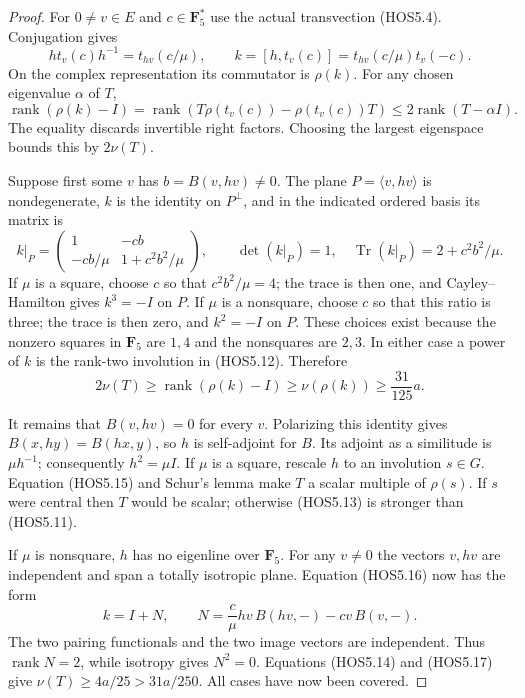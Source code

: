 \begin{proof}
For $0\ne v\in E$ and $c\in\mathbf F_5^*$ use the actual
transvection (HOS5.4). Conjugation gives
\[
 h t_v(c)h^{-1}=t_{hv}(c/\mu),\qquad
 k=[h,t_v(c)]=t_{hv}(c/\mu)t_v(-c).                         \tag{HOS5.16}
\]
On the complex representation its commutator is $\rho(k)$.
For any chosen eigenvalue $\alpha$ of $T$,
\[
 \operatorname{rank}(\rho(k)-I)
 =\operatorname{rank}(T\rho(t_v(c))-\rho(t_v(c))T)
 \le2\operatorname{rank}(T-\alpha I).
                                                               \tag{HOS5.17}
\]
The equality discards invertible right factors. Choosing the
largest eigenspace bounds this by $2\nu(T)$.

Suppose first some $v$ has $b=B(v,hv)\ne0$. The plane
$P=\langle v,hv\rangle$ is nondegenerate, $k$ is the identity
on $P^\perp$, and in the indicated ordered basis its matrix is
\[
 k|_P=
 \begin{pmatrix}1&-cb\\-cb/\mu&1+c^2b^2/\mu\end{pmatrix},
 \qquad \det(k|_P)=1,\quad
 \operatorname{Tr}(k|_P)=2+c^2b^2/\mu.                     \tag{HOS5.18}
\]
If $\mu$ is a square, choose $c$ so that $c^2b^2/\mu=4$;
the trace is then one, and Cayley--Hamilton gives $k^3=-I$ on
$P$. If $\mu$ is a nonsquare, choose $c$ so that this ratio is
three; the trace is then zero, and $k^2=-I$ on $P$. These choices
exist because the nonzero squares in $\mathbf F_5$ are $1,4$
and the nonsquares are $2,3$. In either case a power of $k$ is
the rank-two involution in (HOS5.12). Therefore
\[
 2\nu(T)\ge\operatorname{rank}(\rho(k)-I)
          \ge\nu(\rho(k))
          \ge\frac{31}{125}a.                              \tag{HOS5.19}
\]

It remains that $B(v,hv)=0$ for every $v$. Polarizing this
identity gives $B(x,hy)=B(hx,y)$, so $h$ is self-adjoint for
$B$. Its adjoint as a similitude is $\mu h^{-1}$; consequently
$h^2=\mu I$.
If $\mu$ is a square, rescale $h$ to an involution $s\in G$.
Equation (HOS5.15) and Schur's lemma make $T$ a scalar multiple
of $\rho(s)$. If $s$ were central then $T$ would be scalar;
otherwise (HOS5.13) is stronger than (HOS5.11).

If $\mu$ is nonsquare, $h$ has no eigenline over $\mathbf F_5$.
For any $v\ne0$ the vectors $v,hv$ are independent and span a
totally isotropic plane. Equation (HOS5.16) now has the form
\[
 k=I+N,\qquad
 N=\frac c\mu hv\,B(hv,-)-c v\,B(v,-).
                                                               \tag{HOS5.20}
\]
The two pairing functionals and the two image vectors are
independent. Thus $\operatorname{rank}N=2$, while isotropy
gives $N^2=0$. Equations (HOS5.14) and (HOS5.17) give
$\nu(T)\ge4a/25>31a/250$. All cases have now been covered.
\end{proof}

